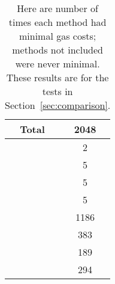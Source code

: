 \begin{table}[p]
\centering
\begin{tabular}{|c|S[table-format=4.0]|}
\hline
Total & 2048 \\
\hline
\Uniswap{}       &    2 \\
\python{}        &    5 \\
\UnrolledOne{}   &    5 \\
\UnrolledTwo{}   &    5 \\
 \UnrolledThree{} &  1186 \\
\WhileOne{}      &  383 \\
\WhileTwo{}      &  189 \\
\WhileThree{}    &  294 \\
\hline
\end{tabular}
\caption[Minimal Gas Costs Statistics]{Here are number of times
    each method had minimal gas costs;
    methods not included were never minimal.
    These results are for the tests in Section~\ref{sec:comparison}.
    }
\label{table:minimal_gas_costs}
\end{table}
